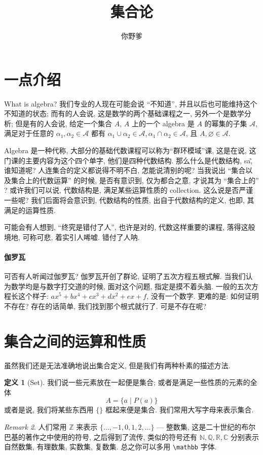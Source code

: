 \documentclass[10pt]{ctexart}
\theoremstyle{definition}
\theoremstyle{definition}
\newtheorem{definition}{定义}[section]
\theoremstyle{plain}
\theoremstyle{remark}
\newtheorem{remark}[definition]{Remark}
\begin{document}
\title{集合论}
\author{你野爹}
\maketitle
\tableofcontents

\newpage

\section{一点介绍}\label{sec:intro}
What is algebra? 我们专业的人现在可能会说 ``不知道'', 并且以后也可能维持这个不知道的状态; 而有的人会说, 这是数学的两个基础课程之一, 另外一个是数学分析; 但是有的人会说, 给定一个集合 \(A\), \(A\) 上的一个 algebra 是 \(A\) 的幂集的子集 \(\mathcal A\), 满足对于任意的 \(\alpha_{1}, \alpha_{2} \in \mathcal A\) 都有 \(\alpha_{1} \cup \alpha_{2} \in \mathcal A, \alpha_{1} \cap \alpha_{2} \in \mathcal A\), 且 \(A , \varnothing \in \mathcal A\). 

Algebra 是一种代称, 大部分的基础代数课程可以称为``群环模域''课, 这是在说, 这门课的主要内容为这个四个单字, 他们是四种代数结构. 那么什么是代数结构, sa\~ , 谁知道呢? 人连集合的定义都说得不明不白, 怎能说清别的呢? 当我说出 ``集合以及集合上的代数运算'' 的时候, 是否有意识到, 仅为都合之意, 才说其为 ``集合上的'' ? 或许我们可以说, 代数结构是, 满足某些运算性质的 collection. 这么说是否严谨一些呢? 我们后面将会意识到, 代数结构的性质, 出自于代数结构的定义, 也即, 其满足的运算性质. 

可能会有人想到, ``终究是错付了人'', 也许是对的, 代数这样重要的课程, 落得这般境地, 可称可悲, 着实引人唏嘘. 错付了人呐. 

\paragraph{伽罗瓦} 可否有人听闻过伽罗瓦? 伽罗瓦开创了群论, 证明了五次方程五根式解. 当我们认为数学均是与数字打交道的时候, 面对这个问题, 指定是摸不着头脑. 一般的五次方程长这个样子: \(a x^{5} + b x ^{4} + c x ^{3} + d x ^{2} + e x + f\), 没有一个数字. 更难的是: 如何证明不存在? 存在的话简单, 我们找到那个根式就行了. 可是不存在呢? 

\section{集合之间的运算和性质}\label{sec:set}
虽然我们还是无法准确地说出集合定义, 但是我们有两种朴素的描述方法. 
\begin{definition}[Set]
我们说一些元素放在一起便是集合; 或者是满足一些性质的元素的全体
\begin{equation}
A = \{ a \mid P (a) \} 
\end{equation}
或者是说, 我们将某些东西用 \(\{ \}\) 框起来便是集合.  我们常用大写字母来表示集合. 
\end{definition}
\begin{remark}
人们常用 \(\mathbb Z\) 来表示 \(\{\dots ,  -1 ,0 , 1 , 2 , \dots \} \) --- 整数集, 这是二十世纪的布尔巴基的著作之中使用的符号, 之后得到了流传, 类似的符号还有 \(\mathbb N, \mathbb Q , \mathbb R, \mathbb C\) 分别表示自然数集, 有理数集, 实数集, 复数集. 总之你可以多用 \verb|\mathbb| 字体. 
\end{remark}
\end{document}

